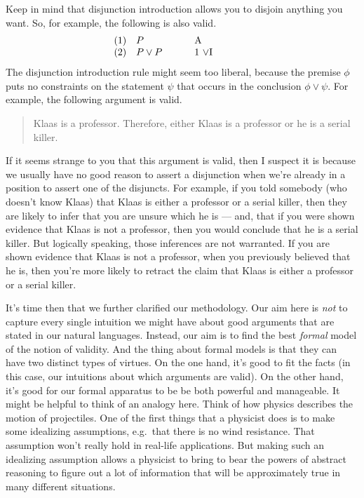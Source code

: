 Keep in mind that disjunction introduction allows you to disjoin anything you
want.  So, for example, the following is also valid.
\[ \begin{array}{l >{$}p{1.75cm}<{$} p{2cm}}
     (1) & P & A \\
     (2) & P\vee P & 1
                     $\vee$I \end{array} \] The disjunction
 introduction rule might seem too liberal, because the premise $\phi$
 puts no constraints on the statement $\psi$ that occurs in the
 conclusion $\phi\vee\psi$.  For example, the following argument is
 valid.
 \begin{quote} Klaas is a professor. \newline Therefore, either Klaas
   is a professor or he is a serial killer.  \end{quote} If it seems
 strange to you that this argument is valid, then I suspect it is
 because we usually have no good reason to assert a disjunction when
 we're already in a position to assert one of the disjuncts.  For
 example, if you told somebody (who doesn't know Klaas) that Klaas is
 either a professor or a serial killer, then they are likely to infer
 that you are unsure which he is --- and, that if you were shown
 evidence that Klaas is not a professor, then you would conclude that
 he is a serial killer.  But logically speaking, those inferences are
 not warranted.  If you are shown evidence that Klaas is not a
 professor, when you previously believed that he is, then you're more
 likely to retract the claim that Klaas is either a professor or a
 serial killer.
 
It's time then that we further clarified our methodology.  Our aim
here is \textit{not} to capture every single intuition we might have
about good arguments that are stated in our natural languages.
Instead, our aim is to find the best \textit{formal} model of the
notion of validity.  And the thing about formal models is that they
can have two distinct types of virtues.  On the one hand, it's good to
fit the facts (in this case, our intuitions about which arguments are
valid).  On the other hand, it's good for our formal apparatus to be
be both powerful and manageable.  It might be helpful to think of an
analogy here.  Think of how physics describes the motion of
projectiles.  One of the first things that a physicist does is to make
some idealizing assumptions, e.g.\ that there is no wind resistance.
That assumption won't really hold in real-life applications.  But
making such an idealizing assumption allows a physicist to bring to
bear the powers of abstract reasoning to figure out a lot of
information that will be approximately true in many different
situations.

